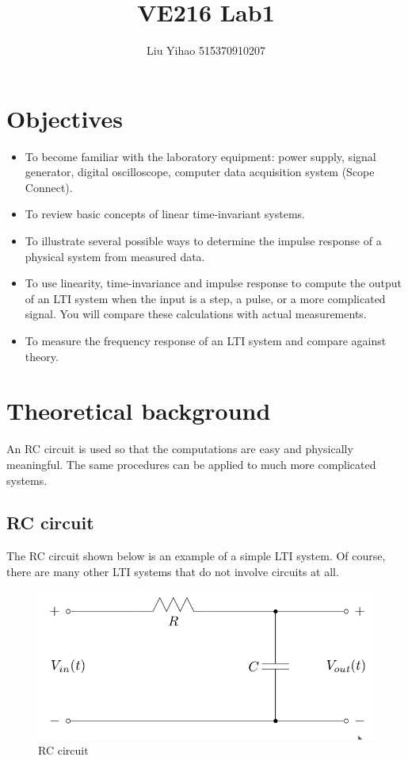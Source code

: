 \documentclass{article}
\title{VE216 Lab1}
\author{Liu Yihao 515370910207}
\date{}
\begin{document}
\maketitle

\section{Objectives}
\begin{itemize}
	\item To become familiar with the laboratory equipment: power supply, signal generator, digital oscilloscope,
computer data acquisition system (Scope Connect).
	\item To review basic concepts of linear time-invariant systems.
	\item To illustrate several possible ways to determine the impulse response of a physical system from measured
data.
	\item To use linearity, time-invariance and impulse response to compute the output of an LTI system when
the input is a step, a pulse, or a more complicated signal. You will compare these calculations with
actual measurements.
	\item To measure the frequency response of an LTI system and compare against theory.
\end{itemize}

\section{Theoretical background}
An RC circuit is used so that the computations are easy and physically meaningful. The same procedures
can be applied to much more complicated systems.

\subsection{RC circuit}
The RC circuit shown below is an example of a simple LTI system. Of course, there are many other LTI
systems that do not involve circuits at all.

\begin{figure}[htbp]
	\centering
	\includegraphics[width=0.7\linewidth]{fig-1.png}
	\caption{RC circuit}
	\label{fig-setup}
\end{figure}
\end{document}
